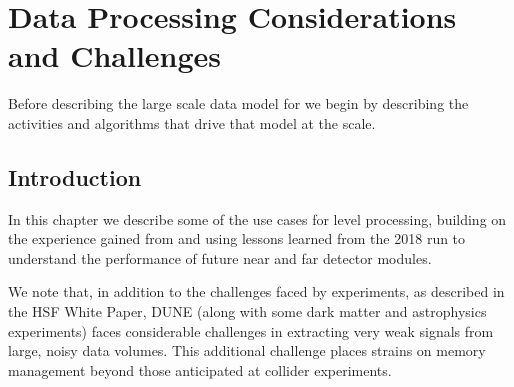 \documentclass[../main-v1.tex]{subfiles}
\begin{document}
\chapter{Data Processing Considerations and Challenges}%
\label{ch:use}
\newcommand{\ignore}[1]{{}}
Before describing the large scale data model for  we begin by describing the activities and algorithms that drive that model at the  scale. 

\section{Introduction }

In this chapter  we describe some of the use cases for  level processing,   %
building on the experience gained from   and   using lessons learned from the 2018 run to understand the performance of future near and far detector modules. 

We note that, in addition to the challenges faced by  experiments, as described in the HSF White Paper\cite{HEPSoftwareFoundation:2017ggl}, DUNE (along with some dark matter and astrophysics experiments) faces considerable challenges in extracting very weak signals from large, noisy data volumes.  This additional challenge places strains on memory management beyond those anticipated at collider experiments. 


\end{document}
